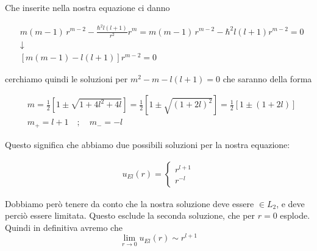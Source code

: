 Che inserite nella nostra equazione ci danno

\begin{align}
{}&m(m-1) \, r^{m-2} - \frac{\hbar^2 l(l+1)}{r^2}r^m= m(m-1) \, r^{m-2} -  \hbar^2 l(l+1)r^{m-2}=0 \nonumber\\
&\downarrow \nonumber \\
&[m(m-1) - l(l+1)]r^{m-2}=0
\end{align}


\newpage
cerchiamo quindi le soluzioni per $m^2 - m - l(l+1)=0$ che saranno della forma

\begin{align}
{}&m = \frac{1}{2}[1 \pm \sqrt{1 + 4l^2 + 4l}] = \frac{1}{2} [1 \pm \sqrt{(1 + 2l)^2}] = \frac{1}{2} [1 \pm (1 + 2l)]\\
&m_+ = l+1 \quad ; \quad m_-= -l
\end{align}

Questo significa che abbiamo due possibili soluzioni per la nostra equazione:

\begin{align}
u_{E l}(r) = \left\{
\begin{array}{cc}
r^{l+1}\\r^{-l}
\end{array}
\right.
\end{align}


Dobbiamo però tenere da conto che la nostra soluzione deve essere $\in L_2$, e deve perciò essere limitata. Questo esclude la seconda soluzione, che per $r=0$ esplode. Quindi in definitiva avremo che 
\begin{equation}
\lim_{r \rightarrow 0} u_{E l}(r)  \sim r^{l+1}
\end{equation}

